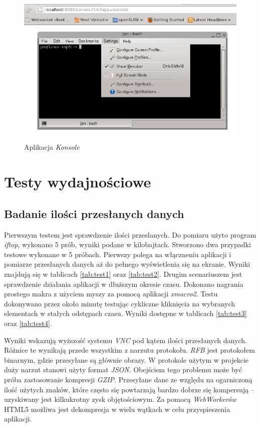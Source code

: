 \begin{figure}[H]
  \centering
  \includegraphics[width=\textwidth,height=!]{img/konsole.png}
  \caption{Aplikacja \emph{Konsole}}
  \label{konsole}
\end{figure}

\section{Testy wydajnościowe}

\subsection{Badanie ilości przesłanych danych}

Pierwszym testem jest sprawdzenie ilości przesłanych. Do pomiaru użyto program \emph{iftop}, wykonano 5 prób, wyniki podane w kilobajtach.
Stworzono dwa przypadki testowe wykonane w 5 próbach. Pierwszy polega na włączneniu aplikacji i pomiarze przesłanych danych aż do pełnego wyświetlenia się na ekranie. Wyniki znajdują się w tablicach \ref{tab:test1} oraz \ref{tab:test2}. Drugim scenariuszem jest sprawdzenie działania aplikacji w dłuższym okresie czasu. Dokonano nagrania prostego makra z użyciem myszy za pomocą aplikacji \emph{xmacro2}. Testu dokonywano przez około minutę testując cykliczne kliknięcia na wybranych elementach w stałych odstępach czasu. Wyniki dostępne w tablicach \ref{tab:test3} oraz \ref{tab:test4}.

Wyniki wskazują wyższość systemu \emph{VNC} pod kątem ilości przesłanych danych. Różnice te wynikają przede wszystkim z narzutu protokołu. \emph{RFB} jest protokołem binarnym, gdzie przesyłane są głównie obrazy. W protokole użytym w projekcie duży narzut stanowi użyty format \emph{JSON}. Obejściem tego problemu może być próba zastosowanie kompresji \emph{GZIP}. Przesyłane dane ze względu na ogarniczoną ilość użytych znaków, które często się powtarzają bardzo dobrze się kompersują -- uzyskiwany jest kilkukrotny zysk objętościowym. Za pomocą \emph{WebWorkerów} HTML5 możliwa jest dekompresja w wielu wątkach w celu przyspieszenia aplikacji.

